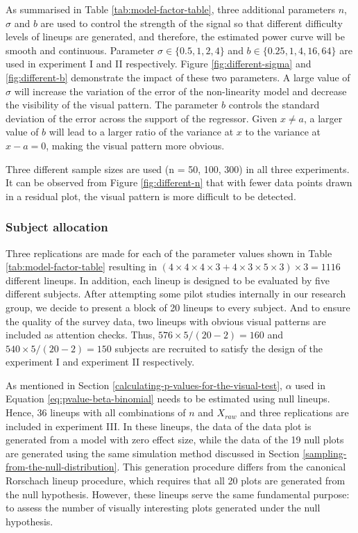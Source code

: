 \documentclass[]{interact}
\theoremstyle{plain}%
\theoremstyle{definition}
\theoremstyle{remark}
\begin{document}
As summarised in Table \ref{tab:model-factor-table}, three additional
parameters \(n\), \(\sigma\) and \(b\) are used to control the strength
of the signal so that different difficulty levels of lineups are
generated, and therefore, the estimated power curve will be smooth and
continuous. Parameter \(\sigma \in \{0.5, 1, 2, 4\}\) and
\(b \in \{0.25, 1, 4, 16, 64\}\) are used in experiment I and II
respectively. Figure \ref{fig:different-sigma} and \ref{fig:different-b}
demonstrate the impact of these two parameters. A large value of
\(\sigma\) will increase the variation of the error of the non-linearity
model and decrease the visibility of the visual pattern. The parameter
\(b\) controls the standard deviation of the error across the support of
the regressor. Given \(x \neq a\), a larger value of \(b\) will lead to
a larger ratio of the variance at \(x\) to the variance at
\(x - a = 0\), making the visual pattern more obvious.

Three different sample sizes are used (n = 50, 100, 300) in all three
experiments. It can be observed from Figure \ref{fig:different-n} that
with fewer data points drawn in a residual plot, the visual pattern is
more difficult to be detected.

\hypertarget{subject-allocation}{%
\subsubsection{Subject allocation}\label{subject-allocation}}

Three replications are made for each of the parameter values shown in
Table \ref{tab:model-factor-table} resulting in
\((4 \times 4 \times 4 \times 3 + 4 \times 3 \times 5 \times 3) \times 3 = 1116\)
different lineups. In addition, each lineup is designed to be evaluated
by five different subjects. After attempting some pilot studies
internally in our research group, we decide to present a block of 20
lineups to every subject. And to ensure the quality of the survey data,
two lineups with obvious visual patterns are included as attention
checks. Thus, \(576 \times 5 / (20-2) = 160\) and
\(540 \times 5 / (20-2) = 150\) subjects are recruited to satisfy the
design of the experiment I and experiment II respectively.

As mentioned in Section \ref{calculating-p-values-for-the-visual-test},
\(\alpha\) used in Equation \ref{eq:pvalue-beta-binomial} needs to be
estimated using null lineups. Hence, 36 lineups with all combinations of
\(n\) and \(X_{raw}\) and three replications are included in experiment
III. In these lineups, the data of the data plot is generated from a
model with zero effect size, while the data of the 19 null plots are
generated using the same simulation method discussed in Section
\ref{sampling-from-the-null-distribution}. This generation procedure
differs from the canonical Rorschach lineup procedure, which requires
that all 20 plots are generated from the null hypothesis. However, these
lineups serve the same fundamental purpose: to assess the number of
visually interesting plots generated under the null hypothesis.
\end{document}
